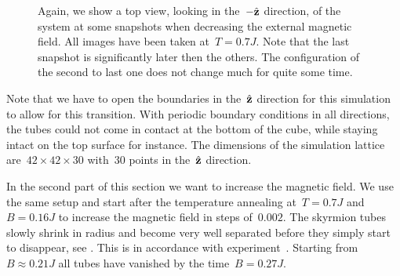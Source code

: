 \begin{figure}[H]
  \centering
  \caption{Again, we show a top view, \ie{} looking in the~$-\hat{\mathbf{z}}$ direction, of
  the system at some snapshots when decreasing the external magnetic field. All
  images have been taken at~$T=0.7 J$. Note that the last snapshot is
  significantly later then the others. The configuration of the second to last
  one does not change much for quite some time.}
\label{fig:hedgehog}
\end{figure}

Note that we have to open the boundaries in the~$\hat{\mathbf{z}}$ direction for this
simulation to allow for this transition. With periodic boundary conditions in
all directions, the tubes could not come in contact at the bottom of the cube,
while staying intact on the top surface for instance. The dimensions of the
simulation lattice are~$42 \times 42 \times 30$ with~$30$ points in the~$\hat{\mathbf{z}}$
direction.

In the second part of this section we want to increase the magnetic field. We
use the same setup and start after the temperature annealing at~$T = 0.7 J$
and~$B = 0.16 J$ to increase the magnetic field in steps of~$0.002$. The
skyrmion tubes slowly shrink in radius and become very well separated before
they simply start to disappear, see . This is in accordance
with experiment~. Starting from~$B \approx 0.21 J$ all tubes have
vanished by the time~$B = 0.27 J$.

